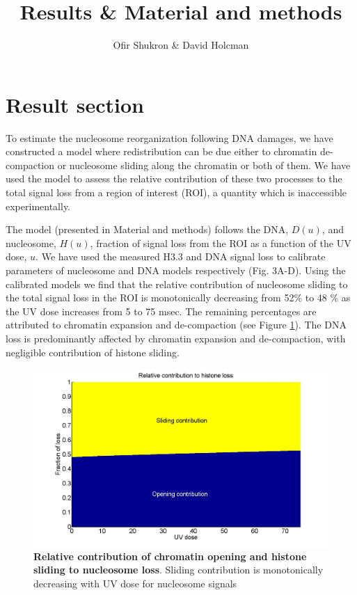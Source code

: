 \documentclass[12pt]{article}
\begin{document}
	
\title{Results \& Material and methods}
\author{Ofir Shukron \& David Holcman}
\maketitle

\section{Result section}

To estimate the nucleosome reorganization following DNA damages, we have constructed a model where redistribution can be due either to chromatin de-compaction or nucleosome sliding along the chromatin or both of them. We have used the model to assess the relative contribution of these two processes to the total signal loss from a region of interest (ROI), a quantity which is inaccessible experimentally. 

The model (presented in Material and methods) follows the DNA, $D(u)$, and nucleosome, $H(u)$, fraction of signal loss from the ROI as a function of the UV dose, $u$. We have used the measured H3.3 and DNA signal loss to calibrate parameters of nucleosome and DNA models respectively (Fig. 3A-D). Using the calibrated models we find that the relative contribution of nucleosome sliding to the total signal loss in the ROI is monotonically decreasing from 52\% to 48 \% as the UV dose increases from 5 to 75 msec. The remaining percentages are attributed to chromatin expansion and de-compaction (see Figure \ref{fig:relatiiveContributionToLoss}). The DNA loss is predominantly affected by chromatin expansion and de-compaction, with negligible contribution of histone sliding.  

\begin{figure}[H]
\centering
	\includegraphics[width=0.5\linewidth, height=0.3\textheight]{relativeContributionToHistoneLoss}
	\caption{\textbf{Relative contribution of chromatin opening and histone sliding to nucleosome loss}. Sliding contribution is monotonically decreasing with UV dose for nucleosome signals}
	\label{fig:relatiiveContributionToLoss}
\end{figure}
\end{document}
